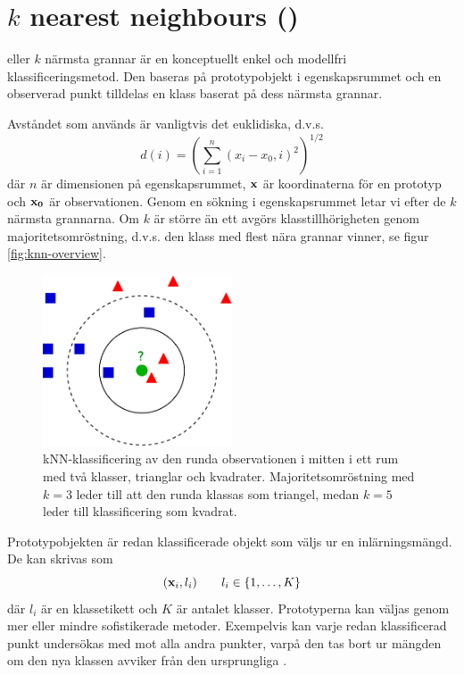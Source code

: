 \documentclass[../rapport_MVEX01-11-05]{subfiles}
\begin{document}
\section{$k$ nearest neighbours (\knn)}\label{sec:knn}

\knn eller $k$ närmsta grannar är en konceptuellt enkel och modellfri
klassificeringsmetod.
Den baseras på prototypobjekt i egenskapsrummet och en observerad punkt
tilldelas en klass baserat på dess närmsta grannar.

Avståndet som används är vanligtvis det euklidiska, d.v.s.
\begin{equation*}
    d(i) = \left(\sum_{i=1}^n(x_i-x_0,i)^2\right)^{1/2}
\end{equation*}
där $n$ är dimensionen på egenskapsrummet, $\mathbf{x}$ är koordinaterna för en
prototyp och $\mathbf{x_0}$ är observationen. Genom en sökning i
egenskapsrummet letar vi efter de $k$ närmsta grannarna. Om $k$ är större än ett
avgörs klasstillhörigheten genom majoritetsomröstning, d.v.s. den klass med flest
nära grannar vinner, se figur \vref{fig:knn-overview}.

\begin{figure}[!htb]
    \begin{center}
\includegraphics[width=0.5\textwidth]{bilder/KnnClassification}
    \end{center}
    \caption{kNN-klassificering av den runda observationen i mitten i ett rum
    med två klasser, trianglar och kvadrater. Majoritetsomröstning
    med $k=3$ leder till att den runda klassas som triangel, medan $k=5$ leder
    till klassificering som kvadrat.}
    \label{fig:knn-overview}
\end{figure}

Prototypobjekten är redan klassificerade objekt som väljs ur en inlärningsmängd.
De kan skrivas som
\begin{equation*}
    (\mathbf{x}_i, l_i)\qquad l_i \in \{ 1,\dotsc,K \}
\end{equation*}
där $l_i$ är en klassetikett och $K$ är antalet klasser.
Prototyperna kan väljas genom mer eller mindre sofistikerade metoder.
Exempelvis kan varje redan klassificerad punkt undersökas med \knn mot
alla andra punkter, varpå den tas bort ur mängden om den nya klassen avviker
från den ursprungliga \cite{Mazurowski11}.
\end{document}
